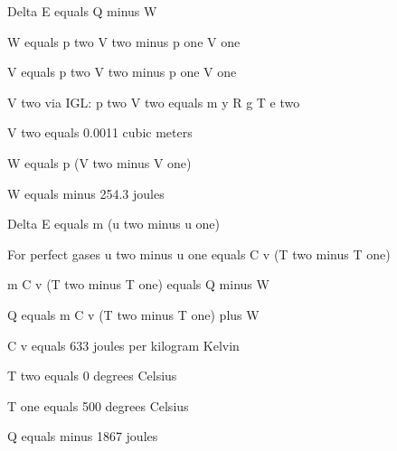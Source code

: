 Delta E equals Q minus W

W equals p two V two minus p one V one

V equals p two V two minus p one V one

V two via IGL: p two V two equals m y R g T e two

V two equals 0.0011 cubic meters

W equals p (V two minus V one)

W equals minus 254.3 joules

Delta E equals m (u two minus u one)

For perfect gases u two minus u one equals C v (T two minus T one)

m C v (T two minus T one) equals Q minus W

Q equals m C v (T two minus T one) plus W

C v equals 633 joules per kilogram Kelvin

T two equals 0 degrees Celsius

T one equals 500 degrees Celsius

Q equals minus 1867 joules